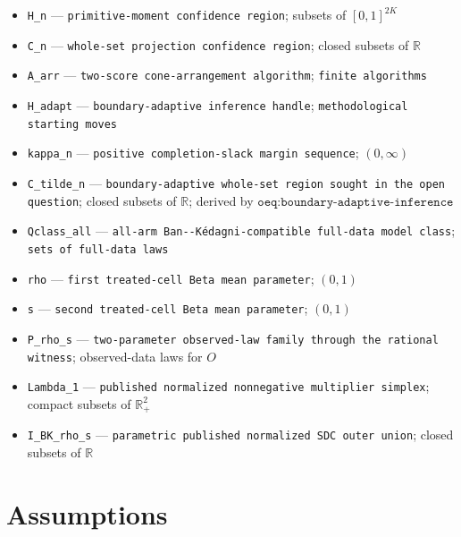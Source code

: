 \documentclass{article}
\begin{document}
\begin{itemize}
  \item \texttt{H\_\allowbreak{}n} --- \texttt{primitive-\allowbreak{}moment confidence region}; subsets of \([0,1]^{2K}\)
  \item \texttt{C\_\allowbreak{}n} --- \texttt{whole-\allowbreak{}set projection confidence region}; closed subsets of \(\mathbb R\)
  \item \texttt{A\_\allowbreak{}arr} --- \texttt{two-\allowbreak{}score cone-\allowbreak{}arrangement algorithm}; \texttt{finite algorithms}
  \item \texttt{H\_\allowbreak{}adapt} --- \texttt{boundary-\allowbreak{}adaptive inference handle}; \texttt{methodological starting moves}
  \item \texttt{kappa\_\allowbreak{}n} --- \texttt{positive completion-\allowbreak{}slack margin sequence}; \((0,\infty)\)
  \item \texttt{C\_\allowbreak{}tilde\_\allowbreak{}n} --- \texttt{boundary-\allowbreak{}adaptive whole-\allowbreak{}set region sought in the open question}; closed subsets of \(\mathbb R\); derived by \(\texttt{oeq:boundary-adaptive-inference}\)
  \item \texttt{Qclass\_\allowbreak{}all} --- \texttt{all-\allowbreak{}arm Ban-\allowbreak{}-\allowbreak{}Kédagni-\allowbreak{}compatible full-\allowbreak{}data model class}; \texttt{sets of full-\allowbreak{}data laws}
  \item \texttt{rho} --- \texttt{first treated-\allowbreak{}cell Beta mean parameter}; \((0,1)\)
  \item \texttt{s} --- \texttt{second treated-\allowbreak{}cell Beta mean parameter}; \((0,1)\)
  \item \texttt{P\_\allowbreak{}rho\_\allowbreak{}s} --- \texttt{two-\allowbreak{}parameter observed-\allowbreak{}law family through the rational witness}; observed-data laws for \(O\)
  \item \texttt{Lambda\_\allowbreak{}1} --- \texttt{published normalized nonnegative multiplier simplex}; compact subsets of \(\mathbb R_+^2\)
  \item \texttt{I\_\allowbreak{}BK\_\allowbreak{}rho\_\allowbreak{}s} --- \texttt{parametric published normalized SDC outer union}; closed subsets of \(\mathbb R\)
\end{itemize}

\section{Assumptions}
\end{document}
